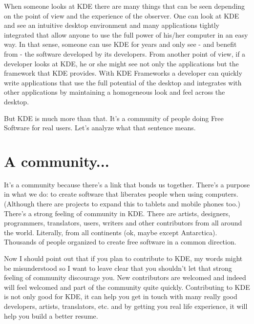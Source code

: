 
\noindent{}When someone looks at KDE there are many things that can be seen depending on the point of view and the experience of the observer. One can look at KDE and see an intuitive desktop environment and many applications tightly integrated that allow anyone to use the full power of his/her computer in an easy way. In that sense, someone can use KDE for years and only see - and benefit from - the software developed by its developers. From another point of view, if a developer looks at KDE, he or she might see not only the applications but the framework that KDE provides. With KDE Frameworks a developer can quickly write applications that use the full potential of the desktop and integrates with other applications by maintaining a homogeneous look and feel across the desktop. 

But KDE is much more than that. It's a community of people doing Free Software for real users. Let's analyze what that sentence means.

\section*{A community...}
It's a community because there's a link that bonds us together. There's a purpose in what we do: to create software that liberates people when using computers. (Although there are projects to expand this to tablets and mobile phones too.) There's a strong feeling of community in KDE. There are artists, designers, programmers, translators, users, writers and other contributors from all around the world. Literally, from all continents (ok, maybe except Antarctica). Thousands of people organized to create free software in a common direction. 

Now I should point out that if you plan to contribute to KDE, my words might be misunderstood so I want to leave clear that you shouldn't let that strong feeling of community discourage you. New contributors are welcomed and indeed will feel welcomed and part of the community quite quickly. Contributing to KDE is not only good for KDE, it can help you get in touch with many really good developers, artists, translators, etc. and by getting you real life experience, it will help you build a better resume.


